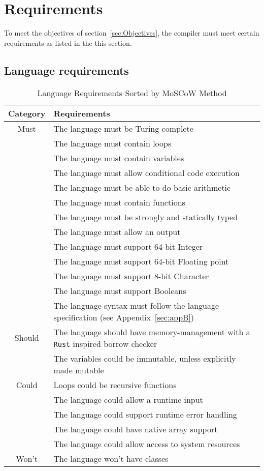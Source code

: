 \newpage
\section{Requirements}
\label{sec:Requirements}

To meet the objectives of section~\ref{sec:Objectives}, the compiler must meet
certain requirements as listed in the this section.

\subsection{Language requirements} 

\begin{table}[ht]
\centering
\begin{tabular}{|c|l|}
\hline
\rowcolor{gray!50}
\textbf{Category} & \textbf{Requirements} \\
\hline
Must & The language must be Turing complete \\
     & The language must contain loops \\
     & The language must contain variables \\
     & The language must allow conditional code execution \\
     & The language must be able to do basic arithmetic \\
     & The language must contain functions \\
     & The language must be strongly and statically typed \\
     & The language must allow an output \\
     & The language must support 64-bit Integer \\
     & The language must support 64-bit Floating point \\
     & The language must support 8-bit Character \\
     & The language must support Booleans \\
     & The language syntax must follow the language specification (see
     Appendix~\ref{sec:appB}) \\
\hline
Should & The language should have memory-management with a \texttt{Rust} inspired borrow checker \\
       & The variables could be immutable, unless explicitly made mutable \\
\hline
Could & Loops could be recursive functions \\
     & The language could allow a runtime input \\
     & The language could support runtime error handling \\
     & The language could have native array support \\
     & The language could allow access to system resources \\
\hline
Won't & The language won't have classes \\
\hline
\end{tabular}
\caption{Language Requirements Sorted by MoSCoW Method}
\end{table}

